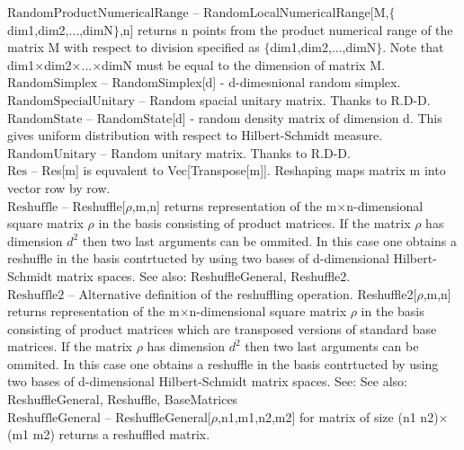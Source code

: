 \documentclass[a4paper,11pt]{article}
\begin{document}
\textbf{$ \text{RandomProductNumericalRange} $ }-- RandomLocalNumericalRange[M,$\{$dim1,dim2,...,dimN$\}$,n] returns n points from the product numerical range of the matrix M with respect to division specified as $\{$dim1,dim2,...,dimN$\}$. Note that dim1$\times $dim2$\times $...$\times $dimN must be equal to the dimension of matrix M.$  $\\

\textbf{$ \text{RandomSimplex} $ }-- RandomSimplex[d] - d-dimesnional random simplex.$  $\\

\textbf{$ \text{RandomSpecialUnitary} $ }-- Random spacial unitary matrix. Thanks to R.D-D.$  $\\

\textbf{$ \text{RandomState} $ }-- RandomState[d] - random density matrix of dimension d. This gives uniform distribution with respect to Hilbert-Schmidt measure.$  $\\

\textbf{$ \text{RandomUnitary} $ }-- Random unitary matrix. Thanks to R.D-D.$  $\\

\textbf{$ \text{Res} $ }-- Res[m] is equvalent to Vec[Transpose[m]]. Reshaping maps matrix m into vector row by row.$  $\\

\textbf{$ \text{Reshuffle} $ }-- Reshuffle[$\rho $,m,n] returns representation of the m$\times $n-dimensional square matrix $\rho $ in the basis consisting of product matrices. If  the matrix $\rho $ has dimension $ d^2 $ then two last arguments can be ommited. In this case one obtains a reshuffle in the basis contrtucted by using two bases of d-dimensional Hilbert-Schmidt matrix spaces. See also: ReshuffleGeneral, Reshuffle2.$  $\\

\textbf{$ \text{Reshuffle2} $ }-- Alternative definition of the reshuffling operation. Reshuffle2[$\rho $,m,n] returns representation of the m$\times $n-dimensional square matrix $\rho $ in the basis consisting of product matrices which are transposed versions of standard base matrices. If the matrix $\rho $ has dimension $ d^2 $ then two last arguments can be ommited. In this case one obtains a reshuffle in the basis contrtucted by using two bases of d-dimensional Hilbert-Schmidt matrix spaces. See: See also: ReshuffleGeneral, Reshuffle, BaseMatrices$  $\\

\textbf{$ \text{ReshuffleGeneral} $ }-- ReshuffleGeneral[$\rho $,n1,m1,n2,m2] for matrix of size (n1 n2)$\times $(m1 m2) returns a reshuffled matrix.$  $\\
\end{document}
